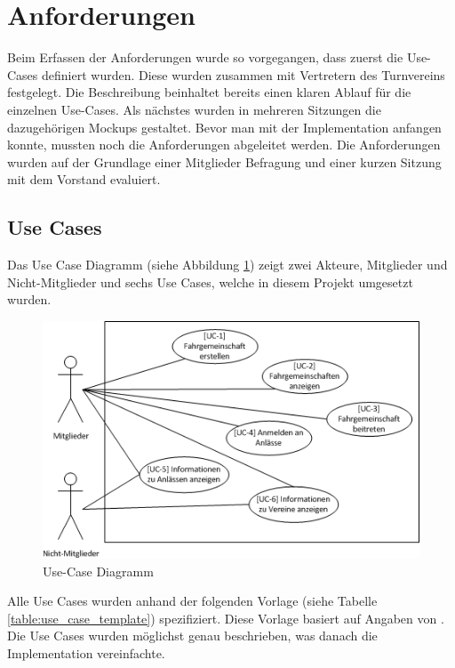 \newpage
\section{Anforderungen}\label{sec.anfoderungen}
Beim Erfassen der Anforderungen wurde so vorgegangen, dass zuerst die Use-Cases definiert wurden. Diese wurden zusammen mit Vertretern des Turnvereins festgelegt. Die Beschreibung beinhaltet bereits einen klaren Ablauf für die einzelnen Use-Cases. Als nächstes wurden in mehreren Sitzungen die dazugehörigen Mockups gestaltet. Bevor man mit der Implementation anfangen konnte, mussten noch die Anforderungen abgeleitet werden. Die Anforderungen wurden auf der Grundlage einer Mitglieder Befragung und einer kurzen Sitzung mit dem Vorstand evaluiert.

\subsection{Use Cases}\label{use_cases}
Das Use Case Diagramm (siehe Abbildung \ref{fig:use_case}) zeigt zwei Akteure, Mitglieder und Nicht-Mitglieder und sechs Use Cases, welche in diesem Projekt umgesetzt wurden.
\begin{figure}[h]
\includegraphics{images/anforderungen/use_cases.png}
\caption{Use-Case Diagramm}
\label{fig:use_case}
\end{figure}

Alle Use Cases wurden anhand der folgenden Vorlage (siehe Tabelle \ref{table:use_case_template}) spezifiziert. Diese Vorlage basiert auf Angaben von \cite{req_eng_book}. Die Use Cases wurden möglichst genau beschrieben, was danach die Implementation vereinfachte.

